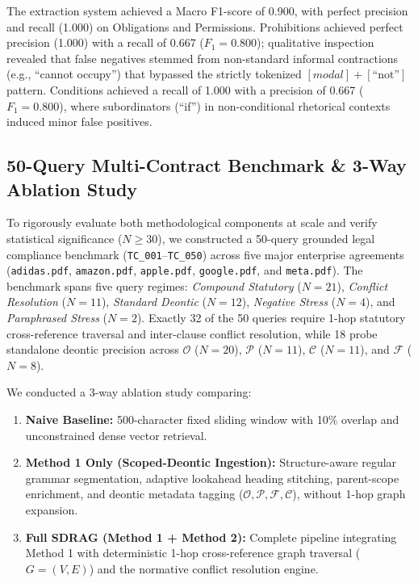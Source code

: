 \documentclass[conference]{IEEEtran}
\begin{document}
The extraction system achieved a Macro F1-score of 0.900, with perfect precision and recall (1.000) on Obligations and Permissions. Prohibitions achieved perfect precision (1.000) with a recall of 0.667 ($F_1 = 0.800$); qualitative inspection revealed that false negatives stemmed from non-standard informal contractions (e.g., ``cannot occupy'') that bypassed the strictly tokenized $[ modal ] + [ \text{``not''} ]$ pattern. Conditions achieved a recall of 1.000 with a precision of 0.667 ($F_1 = 0.800$), where subordinators (``if'') in non-conditional rhetorical contexts induced minor false positives.

\subsection{50-Query Multi-Contract Benchmark \& 3-Way Ablation Study}
To rigorously evaluate both methodological components at scale and verify statistical significance ($N \ge 30$), we constructed a 50-query grounded legal compliance benchmark (\texttt{TC\_001}--\texttt{TC\_050}) across five major enterprise agreements (\texttt{adidas.pdf}, \texttt{amazon.pdf}, \texttt{apple.pdf}, \texttt{google.pdf}, and \texttt{meta.pdf}). The benchmark spans five query regimes: \textit{Compound Statutory} ($N=21$), \textit{Conflict Resolution} ($N=11$), \textit{Standard Deontic} ($N=12$), \textit{Negative Stress} ($N=4$), and \textit{Paraphrased Stress} ($N=2$). Exactly 32 of the 50 queries require 1-hop statutory cross-reference traversal and inter-clause conflict resolution, while 18 probe standalone deontic precision across $\mathcal{O}$ ($N=20$), $\mathcal{P}$ ($N=11$), $\mathcal{C}$ ($N=11$), and $\mathcal{F}$ ($N=8$).

We conducted a 3-way ablation study comparing:
\begin{enumerate}
    \item \textbf{Naive Baseline:} 500-character fixed sliding window with 10\% overlap and unconstrained dense vector retrieval.
    \item \textbf{Method 1 Only (Scoped-Deontic Ingestion):} Structure-aware regular grammar segmentation, adaptive lookahead heading stitching, parent-scope enrichment, and deontic metadata tagging ($\mathcal{O}, \mathcal{P}, \mathcal{F}, \mathcal{C}$), without 1-hop graph expansion.
    \item \textbf{Full SDRAG (Method 1 + Method 2):} Complete pipeline integrating Method 1 with deterministic 1-hop cross-reference graph traversal ($G=(V,E)$) and the normative conflict resolution engine.
\end{enumerate}
\end{document}
